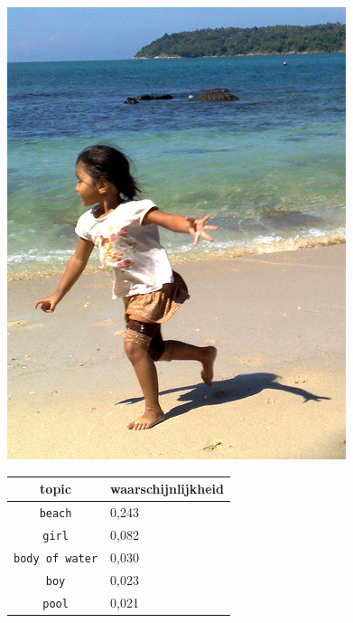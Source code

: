 \begin{figure}[!htb]
    \centering
    \begin{minipage}[t]{.5\linewidth}
    \centering
    \vspace{0pt}
    \includegraphics[width=\textwidth]{Images/LDA/3107059919.jpg}
    \end{minipage}\hfill
    \begin{minipage}[t]{.5\textwidth}
    \centering
    \vspace{0pt}
    \begin{tabular}{cl}
            topic                           & waarschijnlijkheid\\
            \hline
            \texttt{beach}             & 0,243 \\
            \texttt{girl}                   & 0,082 \\
            \texttt{body of water}                 & 0,030 \\
            \texttt{boy}           & 0,023 \\
            \texttt{pool}        & 0,021\\
            \hline
        \end{tabular}
    \end{minipage}
\end{figure}

